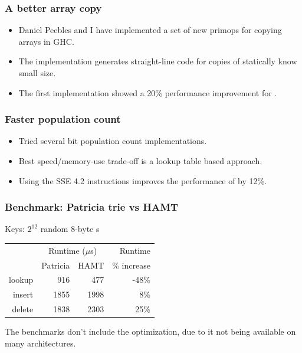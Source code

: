 \documentclass[xetex,mathserif,serif]{beamer}
\newcommand{\code}[1]{\mbox{\texttt{\small{\color{CodeColor}{#1}}}}}
\begin{document}
\begin{frame}
  \frametitle{A better array copy}

  \begin{itemize}
  \item Daniel Peebles and I have implemented a set of new primops for
    copying arrays in GHC.
  \item The implementation generates straight-line code for copies of
    statically know small size.
  \item The first implementation showed a 20\% performance improvement
    for \code{insert}.
  \end{itemize}
\end{frame}

\begin{frame}
  \frametitle{Faster population count}
  \begin{itemize}
  \item Tried several bit population count implementations.
  \item Best speed/memory-use trade-off is a lookup table based
    approach.
  \item Using the \code{POPCNT} SSE 4.2 instructions improves the
    performance of \code{lookup} by 12\%.
  \end{itemize}
\end{frame}

\begin{frame}
  \frametitle{Benchmark: Patricia trie vs HAMT}

  Keys: $2^{12}$ random 8-byte \code{ByteString}s

  \bigskip
  \begin{center}
  \begin{tabular}{r|rrr}
                  & \multicolumn{2}{c}{Runtime ($\mu$s)} & Runtime \\
                  & Patricia & HAMT                      & \% increase \\
    \hline lookup &  916 &  477 & -48\% \\
           insert & 1855 & 1998 & 8\% \\
           delete & 1838 & 2303 & 25\% \\
  \end{tabular}
  \end{center}

  The benchmarks don't include the \code{POPCNT} optimization, due to
  it not being available on many architectures.
\end{frame}
\end{document}

